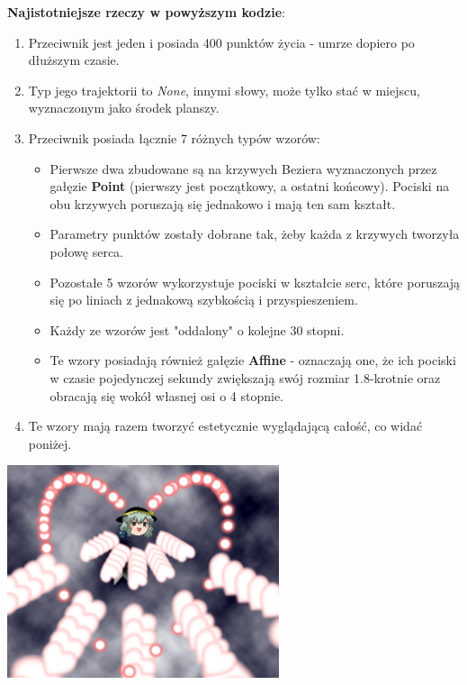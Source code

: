 		\newpage
		\textbf{Najistotniejsze rzeczy w powyższym kodzie}:
		\begin{enumerate}
			\item Przeciwnik jest jeden i posiada 400 punktów życia - umrze dopiero po dłuższym czasie.
			\item Typ jego trajektorii to \textit{None}, innymi słowy, może tylko stać w miejscu, wyznaczonym jako środek planszy.
			\item Przeciwnik posiada łącznie 7 różnych typów wzorów:
			\begin{itemize}
				\item Pierwsze dwa zbudowane są na krzywych Beziera wyznaczonych przez gałęzie \textbf{Point} (pierwszy jest początkowy, a ostatni końcowy). Pociski na obu krzywych poruszają się jednakowo i mają ten sam kształt.
				\item Parametry punktów zostały dobrane tak, żeby każda z krzywych tworzyła połowę serca.
				\item Pozostałe 5 wzorów wykorzystuje pociski w kształcie serc, które poruszają się po liniach z jednakową szybkością i przyspieszeniem.
				\item Każdy ze wzorów jest "oddalony" o kolejne 30 stopni.
				\item Te wzory posiadają również gałęzie \textbf{Affine} - oznaczają one, że ich pociski w czasie pojedynczej sekundy zwiększają swój rozmiar 1.8-krotnie oraz obracają się wokół własnej osi o 4 stopnie.
			\end{itemize}
			\item Te wzory mają razem tworzyć estetycznie wyglądającą całość, co widać poniżej.
		\end{enumerate}
		\begin{center}
			\includegraphics[width=0.60\textwidth]{./images/test4}
		\end{center}
		
		
		
		
		
		